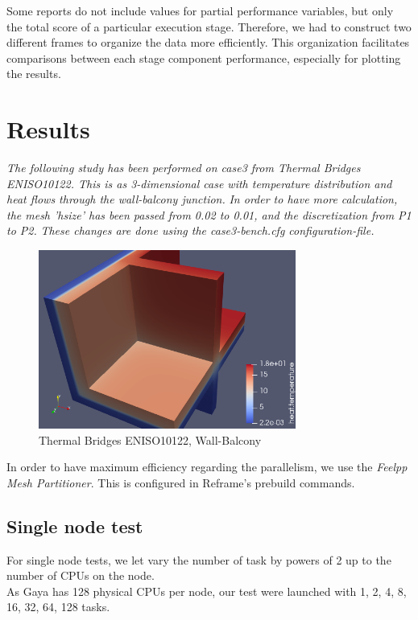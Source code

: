 \documentclass[12pt]{article}
\begin{document}
Some reports do not include values for partial performance variables, but only the total score of a particular execution stage.
Therefore, we had to construct two different frames to organize the data more efficiently.
This organization facilitates comparisons between each stage component performance, especially for plotting the results.
\vspace{15pt}

\section{Results}

\textit{The following study has been performed on case3 from Thermal Bridges ENISO10122. This is as 3-dimensional case with temperature distribution and heat flows through the wall-balcony junction.}
\textit{In order to have more calculation, the mesh 'hsize' has been passed from 0.02 to 0.01, and the discretization from P1 to P2.}
\textit{These changes are done using the case3-bench.cfg configuration-file.}
\vspace{20pt}

\begin{figure}[h]
    \centering
    \includegraphics[width=0.5\linewidth]{../illustrations/balcony.png}
    \vspace{30pt}
    \caption{Thermal Bridges ENISO10122, Wall-Balcony\cite*{Feel++}}
\end{figure}

In order to have maximum efficiency regarding the parallelism, we use the \textit{Feelpp Mesh Partitioner}. This is configured in Reframe's prebuild commands.

\vspace{15pt}
\subsection{Single node test}
For single node tests, we let vary the number of task by powers of 2 up to the number of CPUs on the node. \\
As Gaya has 128 physical CPUs per node, our test were launched with 1, 2, 4, 8, 16, 32, 64, 128 tasks.
\end{document}
